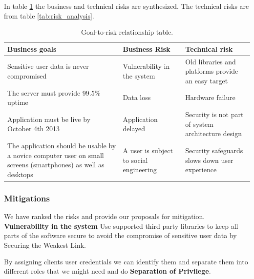 \documentclass[a4paper]{article}
\begin{document}
In table \ref{tab:goal_to_risk_relationship} the business and technical risks are synthesized. The technical risks are from table \ref{tab:risk_analysis}.

\begin{table}[h!]
	\begin{tabular}{| p{4cm} | p{4cm}| p{4cm} |}
    \hline
   	\textbf{Business goals} & \textbf{Business Risk} & \textbf{Technical risk} \\ \hline
   Sensitive user data is never compromised & Vulnerability in the system & Old libraries and platforms provide an easy target \\ \hline
    The server must provide 99.5\% uptime & Data loss &  Hardware failure \\ \hline
    Application must be live by October 4th 2013 & Application delayed &  Security is not part of system architecture design \\ \hline
    The application should be usable by a novice computer user on small screens (smartphones) as well as desktops & A user is subject to social engineering & Security safeguards slows down user experience \\ \hline
    \end{tabular}
    \caption{Goal-to-risk relationship table.}
	\label{tab:goal_to_risk_relationship}
\end{table}



\subsubsection{Mitigations}
We have ranked the risks and provide our proposals for mitigation.
\textbf{Vulnerability in the system}
Use supported third party libraries to keep all parts of the software secure to avoid the compromise of sensitive user data by Securing the Weakest Link.


By assigning clients user credentials we can identify them and separate them into different roles that we might need and do \textbf{Separation of Privilege}.
\end{document}
